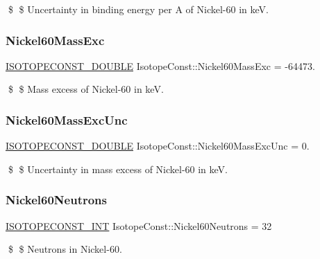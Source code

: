 \$ \$ Uncertainty in binding energy per A of Nickel-\/60 in keV. \mbox{\label{group___isotope_const-_nickel-_ni60_gac19117b1f52ff122776d23a1cd3ccbc3}} 
\subsubsection{\texorpdfstring{Nickel60\+Mass\+Exc}{Nickel60MassExc}}
{\footnotesize\ttfamily \mbox{\hyperlink{group___isotope_const-_macros_ga8f45a7272ce02c0b4c65c44636ed719a}{I\+S\+O\+T\+O\+P\+E\+C\+O\+N\+S\+T\+\_\+\+D\+O\+U\+B\+LE}} Isotope\+Const\+::\+Nickel60\+Mass\+Exc = -\/64473.}

\$ \$ Mass excess of Nickel-\/60 in keV. \mbox{\label{group___isotope_const-_nickel-_ni60_gae3b06a88b09635e89df33bfb5ba59ce0}} 
\subsubsection{\texorpdfstring{Nickel60\+Mass\+Exc\+Unc}{Nickel60MassExcUnc}}
{\footnotesize\ttfamily \mbox{\hyperlink{group___isotope_const-_macros_ga8f45a7272ce02c0b4c65c44636ed719a}{I\+S\+O\+T\+O\+P\+E\+C\+O\+N\+S\+T\+\_\+\+D\+O\+U\+B\+LE}} Isotope\+Const\+::\+Nickel60\+Mass\+Exc\+Unc = 0.}

\$ \$ Uncertainty in mass excess of Nickel-\/60 in keV. \mbox{\label{group___isotope_const-_nickel-_ni60_ga5f5828a6988999251bc05b86ebf8bb4d}} 
\subsubsection{\texorpdfstring{Nickel60\+Neutrons}{Nickel60Neutrons}}
{\footnotesize\ttfamily \mbox{\hyperlink{group___isotope_const-_macros_ga5f18360b3e99483a35c32d789e62621c}{I\+S\+O\+T\+O\+P\+E\+C\+O\+N\+S\+T\+\_\+\+I\+NT}} Isotope\+Const\+::\+Nickel60\+Neutrons = 32}

\$ \$ Neutrons in Nickel-\/60. \mbox{\label{group___isotope_const-_nickel-_ni60_gad5830c4d8b72760e4710756fa30e30de}} 

